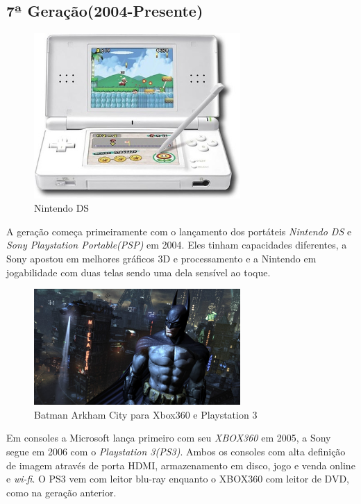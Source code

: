 \documentclass[paper=a4, fontsize=11pt]{scrartcl}	%
\numberwithin{equation}{section}															%
\numberwithin{figure}{section}																%
\numberwithin{table}{section}																%
\begin{document}
\subsection{7ª Geração(2004-Presente)}
\begin{figure}[h!]
	\centering
    \includegraphics[width=0.7\textwidth]{img/nds}
    \caption{Nintendo DS}
\end{figure}
A geração começa primeiramente com o lançamento dos portáteis \textit{Nintendo DS} e \textit{Sony Playstation Portable(PSP)} em 2004. Eles tinham capacidades diferentes, a Sony apostou em melhores gráficos 3D e processamento e a Nintendo em jogabilidade com duas telas sendo uma dela sensível ao toque.\\
\begin{figure}[h!]
	\centering
    \includegraphics[width=0.7\textwidth]{img/bac}
    \caption{Batman Arkham City para Xbox360 e Playstation 3}
\end{figure}
Em consoles a Microsoft lança primeiro com seu \textit{XBOX360} em 2005, a Sony segue em 2006 com o \textit{Playstation 3(PS3)}. Ambos os consoles com alta definição de imagem através de porta HDMI, armazenamento em disco, jogo e venda online e \textit{wi-fi}. O PS3 vem com leitor blu-ray enquanto o XBOX360 com leitor de DVD, como na geração anterior.\\
\end{document}
